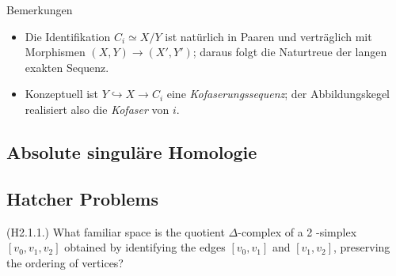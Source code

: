 \documentclass[10pt, letterpaper]{article}
\begin{document}
Bemerkungen
\begin{itemize}
  \item Die Identifikation $C_i\simeq X/Y$ ist natürlich in Paaren und verträglich mit Morphismen $(X,Y)\to (X',Y')$; daraus folgt die Naturtreue der langen exakten Sequenz.
  \item Konzeptuell ist $Y\hookrightarrow X\to C_i$ eine \emph{Kofaserungssequenz}; der Abbildungskegel realisiert also die \emph{Kofaser} von $i$.
\end{itemize}



\subsection{Absolute singuläre Homologie}







\pagebreak

\subsection{Hatcher Problems}




(H2.1.1.) What
 familiar space is the quotient $\Delta$-complex of a 2 -simplex $\left[v_0, v_1, v_2\right]$ obtained by identifying the edges $\left[v_0, v_1\right]$ and $\left[v_1, v_2\right]$, preserving the ordering of vertices?



\pagebreak
\printbibliography
\end{document}
